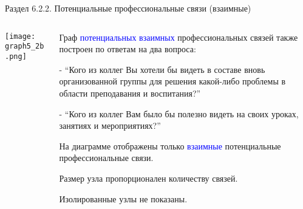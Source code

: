 \begin{frame}{Раздел 6.2.2. Потенциальные профессиональные связи (взаимные)}

\begin{columns} 
\begin{column}{0.75\textwidth}
\centering
          \texttt{[image: graph5\_2b.png]}
\end{column}
\begin{column}{0.25\textwidth} 

\tiny
Граф \textcolor{blue}{потенциальных взаимных} профессиональных связей также построен по ответам на два вопроса:
\smallskip

- ``Кого из коллег Вы хотели бы видеть в составе вновь организованной группы для решения какой-либо проблемы в области преподавания и воспитания?''
\smallskip

- ``Кого из коллег Вам было бы полезно видеть на своих уроках, занятиях и мероприятиях?''
\smallskip

На диаграмме отображены только \textcolor{blue}{взаимные} потенциальные профессиональные связи.
\smallskip

Размер узла пропорционален количеству связей.
\smallskip

Изолированные узлы не показаны.

\end{column}
\end{columns}
\end{frame}


